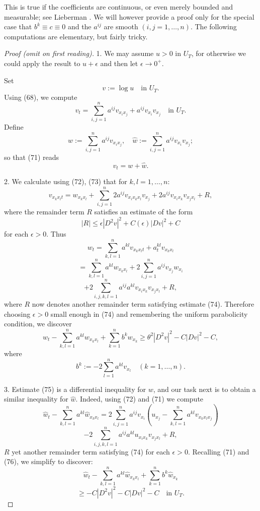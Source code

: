 This is true if the coefficients are continuous, or even merely bounded and measurable; see Lieberman \cite{Lieberman1996}. We will however provide a proof only for the special case that $b^k \equiv c \equiv 0$ and the $a^{ij}$ are smooth $(i,j = 1, \ldots, n)$. The following computations are elementary, but fairly tricky.

\begin{proof}[Proof (omit on first reading)]
1. We may assume $u > 0$ in $U_T$, for otherwise we could apply the result to $u + \epsilon$ and then let $\epsilon \to 0^+$.

Set
\[
v := \log u \quad \text{in } U_T.
\tag{70}
\]
Using (68), we compute
\[
v_t = \sum_{i,j=1}^n a^{ij} v_{x_i x_j} + a^{ij} v_{x_i} v_{x_j} \quad \text{in } U_T.
\tag{71}
\]
Define
\[
w := \sum_{i,j=1}^n a^{ij} v_{x_i x_j}, \quad \hat{w} := \sum_{i,j=1}^n a^{ij} v_{x_i} v_{x_j};
\tag{72}
\]
so that (71) reads
\[
v_t = w + \hat{w}.
\tag{73}
\]

2. We calculate using (72), (73) that for $k, l = 1, \ldots, n$:
\[
v_{x_k x_l t} = w_{x_k x_l} + \sum_{i,j=1}^n 2a^{ij} v_{x_i x_k x_l} v_{x_j} + 2a^{ij} v_{x_i x_k} v_{x_j x_l} + R,
\]
where the remainder term $R$ satisfies an estimate of the form
\[
|R| \leq \epsilon |D^2 v|^2 + C(\epsilon) |Dv|^2 + C
\tag{74}
\]
for each $\epsilon > 0$. Thus
\[
w_t = \sum_{k,l=1}^n a^{kl} v_{x_k x_l t} + a^{kl}_t v_{x_k x_l}
\]
\[
= \sum_{k,l=1}^n a^{kl} w_{x_k x_l} + 2 \sum_{i,j=1}^n a^{ij} v_{x_j} w_{x_i}
\]
\[
+ 2 \sum_{i,j,k,l=1}^n a^{ij} a^{kl} v_{x_i x_k} v_{x_j x_l} + R,
\]
where $R$ now denotes another remainder term satisfying estimate (74). Therefore choosing $\epsilon > 0$ small enough in (74) and remembering the uniform parabolicity condition, we discover
\[
w_t - \sum_{k,l=1}^n a^{kl} w_{x_k x_l} + \sum_{k=1}^n b^k w_{x_k} \geq \theta^2 |D^2 v|^2 - C|Dv|^2 - C,
\tag{75}
\]
where
\[
b^k := -2 \sum_{l=1}^n a^{kl} v_{x_l} \quad (k = 1, \ldots, n).
\tag{76}
\]

3. Estimate (75) is a differential inequality for $w$, and our task next is to obtain a similar inequality for $\hat{w}$. Indeed, using (72) and (71) we compute
\[
\hat{w}_t - \sum_{k,l=1}^n a^{kl} \hat{w}_{x_k x_l} = 2 \sum_{i,j=1}^n a^{ij} v_{x_i} \left( u_{x_j} - \sum_{k,l=1}^n a^{kl} v_{x_k x_l x_j} \right)
\]
\[
- 2 \sum_{i,j,k,l=1}^n a^{ij} a^{kl} u_{x_i x_k} v_{x_j x_l} + R,
\]
$R$ yet another remainder term satisfying (74) for each $\epsilon > 0$. Recalling (71) and (76), we simplify to discover:
\[
\hat{w}_t - \sum_{k,l=1}^n a^{kl} \hat{w}_{x_k x_l} + \sum_{k=1}^n b^k \hat{w}_{x_k}
\]
\[
\geq -C|D^2 v|^2 - C|Dv|^2 - C \quad \text{in } U_T.
\tag{77}
\]


\end{proof}
